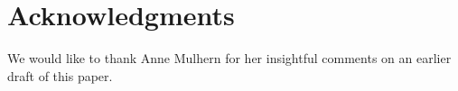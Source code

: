 
\section*{Acknowledgments}

We would like to thank Anne Mulhern for her insightful comments on an earlier draft of this paper.

